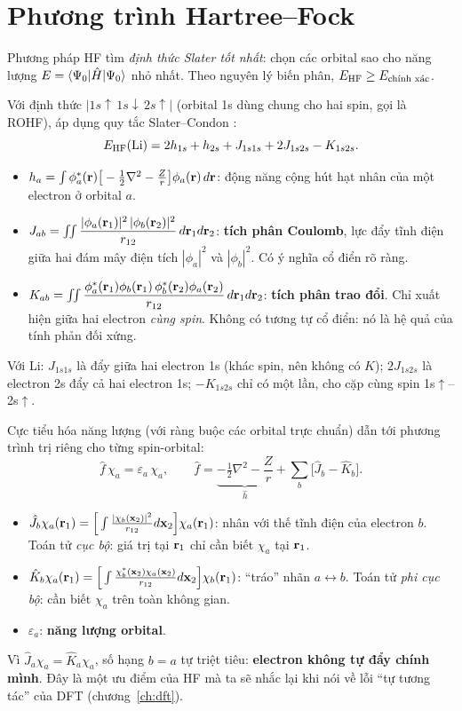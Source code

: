 \section{Phương trình Hartree--Fock}

Phương pháp HF tìm \emph{định thức Slater tốt nhất}: chọn các orbital sao cho năng lượng $E=\langle\Psi_0|\hat H|\Psi_0\rangle$ nhỏ nhất. Theo nguyên lý biến phân, $E_{\mathrm{HF}}\ge E_{\text{chính xác}}$.

\begin{congthuc}
Với định thức $|1s\!\uparrow\,1s\!\downarrow\,2s\!\uparrow|$ (orbital 1s dùng chung cho hai spin, gọi là ROHF), áp dụng quy tắc Slater--Condon \cite{Szabo1996}:
\[
E_{\rm HF}(\text{Li})=2h_{1s}+h_{2s}+J_{1s1s}+2J_{1s2s}-K_{1s2s}.
\]
\begin{itemize}
\item $h_{a}=\int\phi_a^*(\mathbf r)\big[-\tfrac12\nabla^2-\tfrac{Z}{r}\big]\phi_a(\mathbf r)\,d\mathbf r$: động năng cộng hút hạt nhân của một electron ở orbital $a$.
\item $J_{ab}=\iint\dfrac{|\phi_a(\mathbf r_1)|^2\,|\phi_b(\mathbf r_2)|^2}{r_{12}}\,d\mathbf r_1d\mathbf r_2$: \textbf{tích phân Coulomb}, lực đẩy tĩnh điện giữa hai đám mây điện tích $|\phi_a|^2$ và $|\phi_b|^2$. Có ý nghĩa cổ điển rõ ràng.
\item $K_{ab}=\iint\dfrac{\phi_a^*(\mathbf r_1)\phi_b(\mathbf r_1)\,\phi_b^*(\mathbf r_2)\phi_a(\mathbf r_2)}{r_{12}}\,d\mathbf r_1d\mathbf r_2$: \textbf{tích phân trao đổi}. Chỉ xuất hiện giữa hai electron \emph{cùng spin}. Không có tương tự cổ điển: nó là hệ quả của tính phản đối xứng.
\end{itemize}
Với Li: $J_{1s1s}$ là đẩy giữa hai electron 1s (khác spin, nên không có $K$); $2J_{1s2s}$ là electron 2s đẩy cả hai electron 1s; $-K_{1s2s}$ chỉ có một lần, cho cặp cùng spin 1s$\uparrow$--2s$\uparrow$.
\end{congthuc}

\begin{congthuc}
Cực tiểu hóa năng lượng (với ràng buộc các orbital trực chuẩn) dẫn tới phương trình trị riêng cho từng spin-orbital:
\[
\hat f\,\chi_a=\varepsilon_a\,\chi_a,\qquad \hat f=\underbrace{-\tfrac12\nabla^2-\frac{Z}{r}}_{\hat h}+\sum_{b}\big[\hat J_b-\hat K_b\big].
\]
\begin{itemize}
\item $\hat J_b\chi_a(\mathbf r_1)=\Big[\int\frac{|\chi_b(\mathbf x_2)|^2}{r_{12}}d\mathbf x_2\Big]\chi_a(\mathbf r_1)$: nhân với thế tĩnh điện của electron $b$. Toán tử \emph{cục bộ}: giá trị tại $\mathbf r_1$ chỉ cần biết $\chi_a$ tại $\mathbf r_1$.
\item $\hat K_b\chi_a(\mathbf r_1)=\Big[\int\frac{\chi_b^*(\mathbf x_2)\chi_a(\mathbf x_2)}{r_{12}}d\mathbf x_2\Big]\chi_b(\mathbf r_1)$: ``tráo'' nhãn $a\leftrightarrow b$. Toán tử \emph{phi cục bộ}: cần biết $\chi_a$ trên toàn không gian.
\item $\varepsilon_a$: \textbf{năng lượng orbital}.
\end{itemize}
Vì $\hat J_a\chi_a=\hat K_a\chi_a$, số hạng $b=a$ tự triệt tiêu: \textbf{electron không tự đẩy chính mình}. Đây là một ưu điểm của HF mà ta sẽ nhắc lại khi nói về lỗi ``tự tương tác'' của DFT (chương~\ref{ch:dft}).
\end{congthuc}

